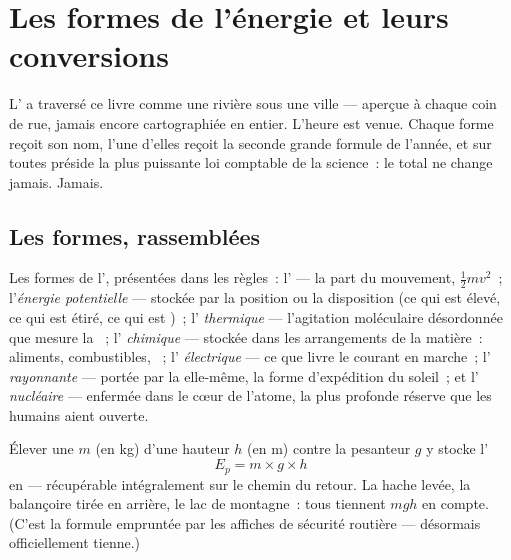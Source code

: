\chapter{Les formes de l'énergie et leurs conversions}\label{ch:g9:energy-conversions}

L' a traversé ce livre comme une rivière sous une ville ---
aperçue à chaque coin de rue, jamais encore cartographiée en entier.
L'heure est venue. Chaque forme reçoit son nom, l'une d'elles reçoit
la seconde grande formule de l'année, et sur toutes préside la plus
puissante loi comptable de la science~: le total ne change jamais.
Jamais.

\section{Les formes, rassemblées}

\begin{definition}\label{def:g9:energy-conversions:forms}
Les formes de l', présentées dans les règles~:
l'\emph{} --- la part du mouvement,
$\frac12 m v^2$~; l'\emph{énergie potentielle}
--- stockée par la position ou la disposition (ce qui est élevé, ce
qui est étiré, ce qui est )~; l'\emph{
thermique} --- l'agitation moléculaire désordonnée que mesure la
~; l'\emph{ chimique} --- stockée dans les
arrangements de la matière~: aliments, combustibles, ~;
l'\emph{ électrique} --- ce que livre le courant en marche~;
l'\emph{ rayonnante} --- portée par la  elle-même, la
forme d'expédition du soleil~; et l'\emph{ nucléaire} ---
enfermée dans le cœur de l'atome, la plus profonde réserve que les
humains aient ouverte.
\end{definition}

\begin{proposition}\label{prop:g9:energy-conversions:ep}
Élever une  $m$ (en \unit{kg}) d'une hauteur $h$ (en \unit{m})
contre la pesanteur $g$ y stocke l'
\[
E_p = m \times g \times h
\]
en  --- récupérable intégralement sur le chemin du retour. La
hache levée, la balançoire tirée en arrière, le lac de montagne~: tous
tiennent $m g h$ en compte. (C'est la formule empruntée par les
affiches de sécurité routière --- désormais officiellement tienne.)
\end{proposition}

